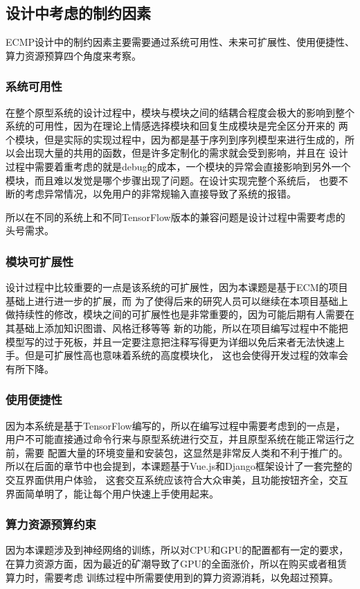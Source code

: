 \documentclass[supercite]{HustGraduPaper}
\theoremstyle{definition}
\begin{document}
\subsection{设计中考虑的制约因素}
ECMP设计中的制约因素主要需要通过系统可用性、未来可扩展性、使用便捷性、算力资源预算四个角度来考察。
\subsubsection{系统可用性}
在整个原型系统的设计过程中，模块与模块之间的结耦合程度会极大的影响到整个系统的可用性，因为在理论上情感选择模块和回复生成模块是完全区分开来的
两个模块，但是实际的实现过程中，因为都是基于序列到序列模型来进行生成的，所以会出现大量的共用的函数，但是许多定制化的需求就会受到影响，并且在
设计过程中需要着重考虑的就是debug的成本，一个模块的异常会直接影响到另外一个模块，而且难以发觉是哪个步骤出现了问题。在设计实现完整个系统后，
也要不断的考虑异常情况，以免用户的非常规输入直接导致了系统的报错。

所以在不同的系统上和不同TensorFlow版本的兼容问题是设计过程中需要考虑的头号需求。

\subsubsection{模块可扩展性}
设计过程中比较重要的一点是该系统的可扩展性，因为本课题是基于ECM\cite{DBLP:journals/corr/ZhouHZZL17}的项目基础上进行进一步的扩展，而
为了使得后来的研究人员可以继续在本项目基础上做持续性的修改，模块之间的可扩展性也是非常重要的，因为可能后期有人需要在其基础上添加知识图谱、风格迁移等等
新的功能，所以在项目编写过程中不能把模型写的过于死板，并且一定要注意把注释写得更为详细以免后来者无法快速上手。但是可扩展性高也意味着系统的高度模块化，
这也会使得开发过程的效率会有所下降。

\subsubsection{使用便捷性}
因为本系统是基于TensorFlow编写的，所以在编写过程中需要考虑到的一点是，用户不可能直接通过命令行来与原型系统进行交互，并且原型系统在能正常运行之前，需要
配置大量的环境变量和安装包，这显然是非常反人类和不利于推广的。所以在后面的章节中也会提到，本课题基于Vue.js和Django框架设计了一套完整的交互界面供用户体验，
这套交互系统应该符合大众审美，且功能按钮齐全，交互界面简单明了，能让每个用户快速上手使用起来。

\subsubsection{算力资源预算约束}
因为本课题涉及到神经网络的训练，所以对CPU和GPU的配置都有一定的要求，在算力资源方面，因为最近的矿潮导致了GPU的全面涨价，所以在购买或者租赁算力时，需要考虑
训练过程中所需要使用到的算力资源消耗，以免超过预算。
\end{document}
